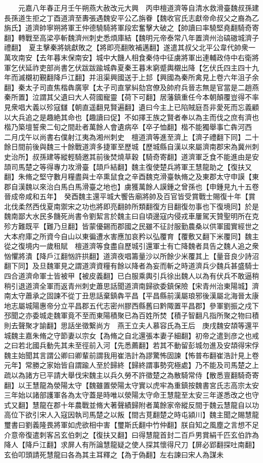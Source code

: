 　　元嘉八年春正月壬午朔燕大赦改元大興　丙申檀道濟等自清水救滑臺魏叔孫建長孫道生拒之丁酉道濟至夀張遇魏安平公乙旃眷【魏收官氏志獻帝命叔父之裔為乙旃氏】道濟帥寧朔將軍王仲德驍騎將軍段宏奮擊大破之【帥讀曰率驍堅堯翻騎奇寄翻】轉戰至高梁亭斬魏濟州刺史悉煩庫結【魏明元帝泰常八年置濟州治碻磝城濟子禮翻】　夏主擊秦將姚獻敗之【將即亮翻敗補邁翻】遂遣其叔父北平公韋代帥衆一萬攻南安【去年暮末保南安】城中大饑人相食秦侍中征虜將軍出連輔政侍中右衛將軍乞伏延祚吏部尚書乞伏跋跋踰城犇夏秦王暮末窮蹙輿櫬出降【乞伏氏四主四十九年而滅櫬初覲翻降戶江翻】并沮渠興國送于上邽【興國為秦所禽見上卷六年沮子余翻】秦太子司直焦楷犇廣寧【太子司直掌糾劾宫僚及帥府兵晉志無是官當是二趙燕秦所置】泣謂其父遺曰大人荷國寵靈【荷下可翻】居藩鎮重任今本朝顛覆豈得不率見衆唱大義以殄寇讎【朝直遥翻見賢遍翻】遺曰今主上已陷賊庭吾非愛死而忘義顧以大兵追之是趣絶其命也【趣讀曰促】不如擇王族之賢者奉以為主而伐之庶有濟也楷乃築壇誓衆二旬之間赴者萬餘人會遺病卒【卒子恤翻】楷不能獨舉事亡犇河西　二月戊午以尚書右僕射江夷為湘州刺史　檀道濟等進至濟上【濟子禮翻下同】二十餘日間前後與魏三十餘戰道濟多捷軍至歷城【歷城縣自漢以來屬濟南郡宋為冀州刺史治所】叔孫建等縱輕騎邀其前後焚燒草穀【騎奇寄翻】道濟軍乏食不能進由是安頡司馬楚之等得專力攻滑臺【頡戶結翻】魏主復使楚兵將軍王慧龍助之【復扶又翻】朱脩之堅守數月糧盡與士卒熏鼠食之辛酉魏克滑臺執脩之及東郡太守申謨【東郡自漢魏以來治白馬白馬滑臺之地也】虜獲萬餘人謨鍾之曾孫也【申鍾見九十五卷晉成帝咸和五年】　癸酉魏主還平城大饗告廟將帥及百官皆受賞戰士賜復十年【賞北伐柔然西伐夏南禦宋之功也將即亮翻帥所類翻復方目翻復勿事也下復境同】於是魏南鄙大水民多饑死尚書令劉絜言於魏主曰自頃邊寇内侵戎車屢駕天贊聖明所在克殄方難既平【難乃旦翻】皆蒙優錫而郡國之民雖不征討服勤農桑以供軍國實經世之大本府庫之所資今自山以東徧遭水害應加哀矜以弘覆育【覆敷又翻下米覆同】魏主從之復境内一歲租賦　檀道濟等食盡自歷城引還軍士有亡降魏者具告之魏人追之衆忷懼將潰【降戶江翻忷許拱翻】道濟夜唱籌量沙以所餘少米覆其上【量音良少詩沼翻下同】及旦魏軍見之謂道濟資糧有餘以降者為妄而斬之時道濟兵少魏兵甚盛騎士四合道濟命軍士皆被甲【被皮義翻】已白服乘輿引兵徐出魏人以為有伏兵不敢逼稍稍引退道濟全軍而返青州刺史蕭思話聞道濟南歸欲委鎮保險【宋青州治東陽城】濟南太守蕭承之固諫不從丁丑思話棄鎮犇平昌【平昌縣前漢屬琅邪後漢屬北海晉太康地志屬城陽惠帝分立平昌郡五代志密州膠西縣舊曰黔陬置平昌郡】參軍劉振之戍下邳聞之亦委城走魏軍竟不至而東陽積聚已為百姓所焚【積子智翻凡指所聚之物曰積則去聲聚才諭翻】思話坐徵繋尚方　燕王立夫人慕容氏為王后　庚戌魏安頡等還平城魏主嘉朱脩之守節妻以宗女【為脩之自北還張本妻子細翻】初帝之遣到彦之也戒之曰若北國兵動先其未至徑前入河【先悉薦翻】若其不動留彭城勿進及安頡得宋俘魏主始聞其言謂公卿曰卿輩前謂我用崔浩計為謬驚怖固諫【怖普布翻崔浩計見上卷元年】常勝之家始皆自謂踰人至於歸終【歸終謂事勢究極處】乃不能及司馬楚之上疏以為諸方已平請大舉伐宋魏主以兵久勞不許徵楚之為散騎常侍【散悉亶翻騎奇寄翻】以王慧龍為滎陽太守【魏雖置滎陽太守實以虎牢為重鎮按魏書宮氏志高宗太安三年始以諸部護軍各為太守蓋是時唯以滎陽太守命王慧龍至太安三年遂悉改之也守式又翻】慧龍在郡十年農戰並脩大著聲績歸附者萬餘家帝縱反間于魏云慧龍自以功高位下欲引宋人入寇因執司馬楚之以叛【間古莧翻楚之時屯潁川】魏主聞之賜慧龍璽書曰劉義隆畏將軍如虎欲相中害【璽斯氏翻中竹仲翻】朕自知之風塵之言想不足介意帝復遣刺客呂玄伯刺之【復扶又翻】曰得慧龍首封二百戶男賞絹千匹玄伯詐為降人【降戶江翻】求屏人有所論慧龍疑之使人探其懷得尺刀【屏必郢翻探吐南翻】玄伯叩頭請死慧龍曰各為其主耳釋之【為于偽翻】左右諫曰宋人為謀未